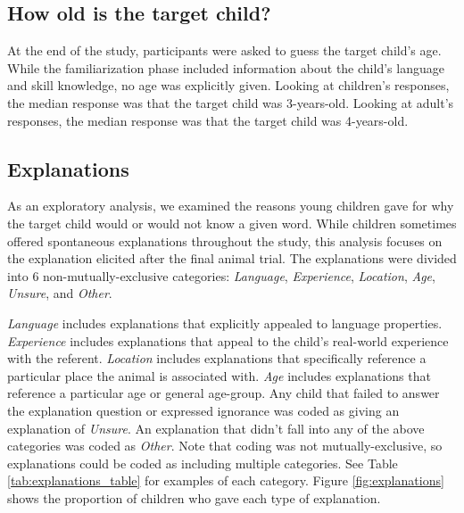 \documentclass[10pt, letterpaper]{article}
\begin{document}
\hypertarget{how-old-is-the-target-child}{%
\subsection{How old is the target
child?}\label{how-old-is-the-target-child}}

At the end of the study, participants were asked to guess the target
child's age. While the familiarization phase included information about
the child's language and skill knowledge, no age was explicitly given.
Looking at children's responses, the median response was that the target
child was 3-years-old. Looking at adult's responses, the median response
was that the target child was 4-years-old.

\hypertarget{explanations}{%
\subsection{Explanations}\label{explanations}}

As an exploratory analysis, we examined the reasons young children gave
for why the target child would or would not know a given word. While
children sometimes offered spontaneous explanations throughout the
study, this analysis focuses on the explanation elicited after the final
animal trial. The explanations were divided into 6
non-mutually-exclusive categories: \emph{Language}, \emph{Experience},
\emph{Location}, \emph{Age}, \emph{Unsure}, and \emph{Other}.

\emph{Language} includes explanations that explicitly appealed to
language properties. \emph{Experience} includes explanations that appeal
to the child's real-world experience with the referent. \emph{Location}
includes explanations that specifically reference a particular place the
animal is associated with. \emph{Age} includes explanations that
reference a particular age or general age-group. Any child that failed
to answer the explanation question or expressed ignorance was coded as
giving an explanation of \emph{Unsure}. An explanation that didn't fall
into any of the above categories was coded as \emph{Other}. Note that
coding was not mutually-exclusive, so explanations could be coded as
including multiple categories. See Table \ref{tab:explanations_table}
for examples of each category. Figure \ref{fig:explanations} shows the
proportion of children who gave each type of explanation.
\end{document}
